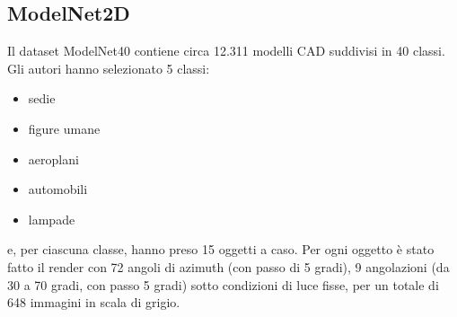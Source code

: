 \documentclass[italian,12pt,a4paper,oneside,final]{report}
\begin{document}
\subsection{ModelNet2D}
Il dataset ModelNet40\cite{dataset:modelnet40} contiene circa 12.311 modelli CAD suddivisi in 40 classi.
Gli autori hanno selezionato 5 classi:
\begin{itemize}
	\item sedie
	\item figure umane
	\item aeroplani
	\item automobili
	\item lampade
\end{itemize}
e, per ciascuna classe, hanno preso 15 oggetti a caso.
Per ogni oggetto è stato fatto il render con 72 angoli di azimuth (con passo di 5 gradi), 9 angolazioni (da 30 a 70 gradi, con passo 5 gradi) sotto condizioni di luce fisse, per un totale di 648 immagini in scala di grigio.
\end{document}
